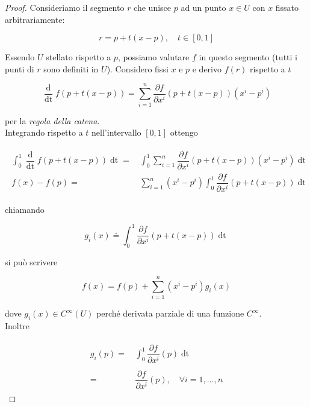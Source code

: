 \begin{proof}
	Consideriamo il segmento $ r $ che  unisce $ p $ ad un punto $ x \in U $ con $ x $ fissato  arbitrariamente:
	
	\begin{equation}
		r=p+t(x-p), \quad t \in [0,1]
	\end{equation}
	
	Essendo $ U $ stellato rispetto a $ p $, possiamo valutare $ f $ in questo segmento (tutti i punti di $ r $ sono definiti in $ U $). Considero fissi $ x $ e $ p $ e derivo $ f(r) $ rispetto a $ t $
	
	\begin{equation}
		\dfrac{\operatorname{d}}{\operatorname{dt}} f(p+t(x-p)) = \sum_{i=1}^{n} \dfrac{\partial f}{\partial x^{i}} (p+t(x-p)) (x^{i}-p^{i})
	\end{equation}
	
	per la \textit{regola della catena}.\\
	Integrando rispetto a $ t $ nell'intervallo $ [0,1] $ ottengo
	
	\begin{align}
		\begin{split}
			\int_{0}^{1} \dfrac{\operatorname{d}}{\operatorname{dt}} f(p+t(x-p)) \operatorname{dt} =& \, \int_{0}^{1} \sum_{i=1}^{n} \dfrac{\partial f}{\partial x^{i}} (p+t(x-p)) (x^{i}-p^{i}) \operatorname{dt}\\
			f(x) - f(p)=& \, \sum_{i=1}^{n} (x^{i}-p^{i}) \int_{0}^{1} \dfrac{\partial f}{\partial x^{i}} (p+t(x-p)) \operatorname{dt}
		\end{split}
	\end{align}
	
	chiamando
	
	\begin{equation}
		g_{i}(x) \doteq \int_{0}^{1} \dfrac{\partial f}{\partial x^{i}} (p+t(x-p)) \operatorname{dt}
	\end{equation}
	
	si può scrivere
	
	\begin{equation}
		f(x)= f(p) + \sum_{i=1}^{n} (x^{i}-p^{i}) g_{i}(x)
	\end{equation}
	
	dove $ g_{i}(x) \in C^{\infty}(U) $ perché derivata parziale di una funzione $ C^{\infty} $.\\
	Inoltre
	
	\begin{align}
		\begin{split}
			g_{i}(p) =& \, \int_{0}^{1} \dfrac{\partial f}{\partial x^{i}} (p) \operatorname{dt}\\\\
			=& \, \dfrac{\partial f}{\partial x^{i}} (p), \quad \forall i=1,\dots,n
		\end{split}
	\end{align}
\end{proof}

